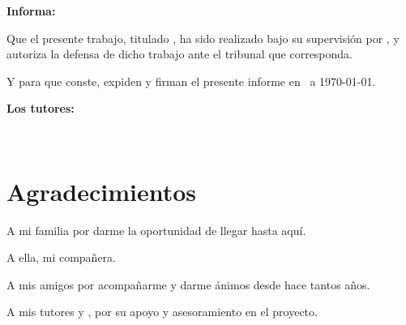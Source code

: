 \textbf{Informa:}

\vspace{0.5cm}

Que el presente trabajo, titulado \textit{\textbf{\titulo}}, ha sido realizado bajo su supervisión por \textbf{\autor}, y 
autoriza la defensa de dicho trabajo ante el tribunal que corresponda.

\vspace{0.5cm}

Y para que conste, expiden y firman el presente informe en \ciudad\ a \today.

\vspace{1cm}

\textbf{Los tutores:}

\vspace{0.5cm}
\vspace{3cm}

\noindent \textbf{\tutor}\\[0.5cm]
\noindent \textbf{\cotutor}

\chapter*{Agradecimientos}
\thispagestyle{empty}

\vspace{1cm}

\bigskip
A mi familia por darme la oportunidad de llegar hasta aquí.

\bigskip
A ella, mi compañera.

\bigskip
A mis amigos por acompañarme y darme ánimos desde hace tantos años.

\bigskip
A mis tutores {\tutor} y {\cotutor}, por su apoyo y asesoramiento en el proyecto.
